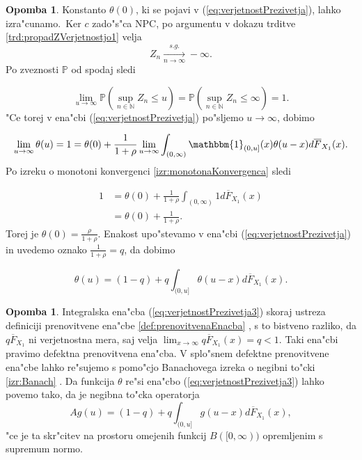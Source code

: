 \documentclass[12pt, a4paper, reqno]{amsart}
\theoremstyle{definition}
\newtheorem{opomba}[definicija]{Opomba}
\theoremstyle{plain}
\newcommand{\N}{\mathbb{N}}
\newcommand{\Prob}{\mathbb{P}}
\newcommand{\1}{\mathds{1}}
\newcommand*{\refPriloga}[1]{%
  \begingroup
    \hypersetup{
      linkcolor=properpurple,
      linkbordercolor=properpurple,
    }%
    \ref{#1}%
  \endgroup
}
\begin{document}
    \begin{opomba}
        Konstanto $\theta(0)$, ki se pojavi v (\ref{eq:verjetnostPrezivetja}), lahko izra"cunamo.\ Ker $c$ zado"s"ca NPC, po argumentu v dokazu trditve
        \ref{trd:propadZVerjetnostjo1} velja 
        \begin{equation*}
            Z_n \xrightarrow[n\to\infty]{s.g.} -\infty.
        \end{equation*}
        Po zveznosti $\Prob$ od spodaj sledi

        \begin{equation*}
            \lim_{u\to\infty}\Prob\left(\sup_{n\in\N}Z_n \leq u\right) = \Prob\left(\sup_{n\in\N}Z_n \leq \infty\right) = 1.
        \end{equation*}
        "Ce torej v ena"cbi (\ref{eq:verjetnostPrezivetja}) po"sljemo $u\to\infty$, dobimo

        \begin{equation*}
            \lim_{u\to\infty}\theta(u) = 1 = \theta(0) + \frac{1}{1 + \rho}\lim_{u\to\infty}\int_{(0, \infty)}\mathbbm{1}_{(0, u]}(x)\theta(u - x)d\overline{F}_{X_1}(x). \\
        \end{equation*}
        Po izreku o monotoni konvergenci \refPriloga{izr:monotonaKonvergenca} sledi

        \begin{align*}
            1 &= \theta(0) + \frac{1}{1 + \rho}\int_{(0, \infty)}1d\overline{F}_{X_1}(x) \\
             &= \theta(0) + \frac{1}{1 + \rho}.
        \end{align*}
        Torej je $\theta(0) = \frac{\rho}{1 + \rho}$.
        Enakost upo"stevamo v ena"cbi (\ref{eq:verjetnostPrezivetja}) in uvedemo oznako $\frac{1}{1 + \rho} = q$, da dobimo

        \begin{equation}
            \theta(u) = (1 - q) + q\int_{(0, u]}\theta(u - x)d\overline{F}_{X_1}(x).
            \label{eq:verjetnostPrezivetja3}
        \end{equation}
        \label{op:verjetnostPrezivetja2}
    \end{opomba}

    \begin{opomba}
    Integralska ena"cba (\ref{eq:verjetnostPrezivetja3}) skoraj ustreza definiciji prenovitvene ena"cbe
    \refPriloga{def:prenovitvenaEnacba}, s 
    to bistveno razliko, da $q\overline{F}_{X_1}$ ni verjetnostna mera, saj velja 
    $\lim_{x\to\infty}q\overline{F}_{X_1}(x) = q < 1$. Taki ena"cbi pravimo
    defektna prenovitvena ena"cba. V splo"snem defektne prenovitvene ena"cbe lahko re"sujemo s pomo"cjo 
    Banachovega izreka o negibni to"cki \refPriloga{izr:Banach}. Da funkcija $\theta$ re"si ena"cbo 
    (\ref{eq:verjetnostPrezivetja3}) lahko povemo tako, da je negibna to"cka operatorja 
    \begin{equation*}
        Ag(u) = (1 - q) + q\int_{(0, u]}g(u - x)d\overline{F}_{X_1}(x),
    \end{equation*}
    "ce je ta skr"citev na prostoru omejenih funkcij $B([0, \infty))$ opremljenim s supremum normo.
    \label{op:OperatorPrenovitvena}
    \end{opomba}
\end{document}
